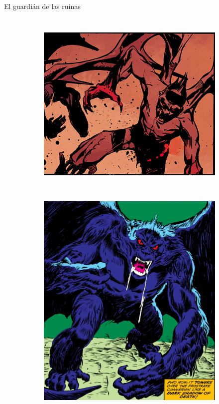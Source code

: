 \begin{frame}{El guardián de las ruinas}
\begin{columns}
\begin{figure}[htp]
\begin{subfigure}[b]{0.27\textwidth}
				\includegraphics[width=\textwidth]{img/guardian/DH}
			\end{subfigure}
			~
			\begin{subfigure}[b]{0.23\textwidth}
				\includegraphics[width=\textwidth]{img/guardian/CTB}
			\end{subfigure}
		\end{figure}
	\end{columns}
\end{frame}
\note[itemize]{
	\item
}

